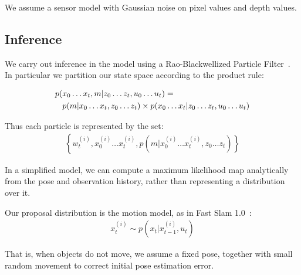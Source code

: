 We assume a sensor model with Gaussian noise on pixel values and depth
values.

\subsection{Inference}

We carry out inference in the model using a Rao-Blackwellized Particle
Filter~\citep{durrant06}.  In particular we partition our state space
according to the product rule:

\begin{align}
p(&x_0 \dots x_t, m | z_0 \dots z_t, u_0 \dots u_t) = \notag\\
& p(m | x_0 \dots x_t, z_0 \dots z_t) \times p(x_0 \dots x_t | z_0 \dots z_t, u_0 \dots u_t)
\end{align}

Thus each particle is represented by the set:
\begin{align}
\left\{ w_t^{(i)}, x_0^{(i)} \dots x_t^{(i)}, p(m | x_0^{(i)} \dots x_t^{(i)}, z_0 \dots z_t)\right\}
\end{align}

In a simplified model, we can compute a maximum likelihood map
analytically from the pose and observation history, rather than
representing a distribution over it.

Our proposal distribution is the motion model, as in Fast Slam
1.0~\citep{montemerlo02}:
\begin{align}
x_t^{(i)} \sim  p(x_t | x_{t-1}^{(i)}, u_t)
\end{align}

That is, when objects do not move, we assume a fixed pose, together
with small random movement to correct initial pose estimation error.
